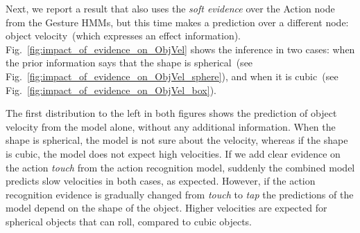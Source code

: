 Next, we report a result that also uses the \emph{soft evidence} over the Action node from the Gesture \acp{HMM}, but this time makes a prediction over a different node: object velocity~(which expresses an effect information).
Fig.~\ref{fig:impact_of_evidence_on_ObjVel} shows the inference in two cases: when the prior information says that the shape is spherical~(see Fig.~\ref{fig:impact_of_evidence_on_ObjVel_sphere}), and when it is cubic~(see Fig.~\ref{fig:impact_of_evidence_on_ObjVel_box}).

The first distribution to the left in both figures shows the prediction of object velocity from the \AffWords{} model alone, without any additional information.
When the shape is spherical, the model is not sure about the velocity, whereas if the shape is cubic, the model does not expect high velocities.
If we add clear evidence on the action \emph{touch} from the action recognition model, suddenly the combined model predicts slow velocities in both cases, as expected.
However, if the action recognition evidence is gradually changed from \emph{touch} to \emph{tap} the predictions of the model depend on the shape of the object.
Higher velocities are expected for spherical objects that can roll, compared to cubic objects.


